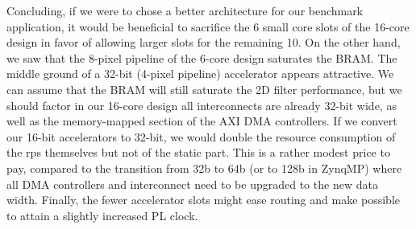 Concluding, if we were to chose a better architecture for our benchmark application,
it would be beneficial to sacrifice the 6 small core slots of the 16-core design 
in favor of allowing larger slots for the remaining 10.
On the other hand, we saw that the 8-pixel pipeline of the 6-core design saturates the BRAM.
The middle ground of a 32-bit (4-pixel pipeline) accelerator appears attractive.
We can assume that the BRAM will still saturate the 2D filter performance, but we should factor in
our 16-core design all interconnects are already 32-bit wide, as well as the memory-mapped section of the AXI DMA controllers.
If we convert our 16-bit accelerators to 32-bit, we would double the resource consumption of the \glspl{rp} themselves but
not of the static part. This is a rather modest price to pay, compared to the transition from 32b to 64b (or to 128b in ZynqMP)
where all DMA controllers and interconnect need to be upgraded to the new data width.
Finally, the fewer accelerator slots might ease routing and make possible to attain a slightly increased PL clock.

